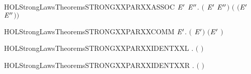 \newcommand{\HOLStrongLawsTheoremsSTRONGXXLEFTXXSUMXXMIDXXIDEMP}{\UseVerbatim{HOLStrongLawsTheoremsSTRONGXXLEFTXXSUMXXMIDXXIDEMP}}
\begin{SaveVerbatim}{HOLStrongLawsTheoremsSTRONGXXPARXXASSOC}
\HOLTokenTurnstile{} \HOLSymConst{\HOLTokenForall{}} \ensuremath{\HOLBoundVar{E}\sp{\prime}} \ensuremath{\HOLBoundVar{E}\sp{\prime\prime}}.  \ensuremath{(} \HOLSymConst{\ensuremath{\mid}} \ensuremath{\HOLBoundVar{E}\sp{\prime}} \HOLSymConst{\ensuremath{\mid}} \ensuremath{\HOLBoundVar{E}\sp{\prime\prime}}\ensuremath{)} \ensuremath{(} \HOLSymConst{\ensuremath{\mid}} \ensuremath{(}\ensuremath{\HOLBoundVar{E}\sp{\prime}} \HOLSymConst{\ensuremath{\mid}} \ensuremath{\HOLBoundVar{E}\sp{\prime\prime}}\ensuremath{)}\ensuremath{)}
\end{SaveVerbatim}
\newcommand{\HOLStrongLawsTheoremsSTRONGXXPARXXASSOC}{\UseVerbatim{HOLStrongLawsTheoremsSTRONGXXPARXXASSOC}}
\begin{SaveVerbatim}{HOLStrongLawsTheoremsSTRONGXXPARXXCOMM}
\HOLTokenTurnstile{} \HOLSymConst{\HOLTokenForall{}} \ensuremath{\HOLBoundVar{E}\sp{\prime}}.  \ensuremath{(} \HOLSymConst{\ensuremath{\mid}} \ensuremath{\HOLBoundVar{E}\sp{\prime}}\ensuremath{)} \ensuremath{(}\ensuremath{\HOLBoundVar{E}\sp{\prime}} \HOLSymConst{\ensuremath{\mid}} \ensuremath{)}
\end{SaveVerbatim}
\newcommand{\HOLStrongLawsTheoremsSTRONGXXPARXXCOMM}{\UseVerbatim{HOLStrongLawsTheoremsSTRONGXXPARXXCOMM}}
\begin{SaveVerbatim}{HOLStrongLawsTheoremsSTRONGXXPARXXIDENTXXL}
\HOLTokenTurnstile{} \HOLSymConst{\HOLTokenForall{}}.  \ensuremath{(} \HOLSymConst{\ensuremath{\mid}} \ensuremath{)} 
\end{SaveVerbatim}
\newcommand{\HOLStrongLawsTheoremsSTRONGXXPARXXIDENTXXL}{\UseVerbatim{HOLStrongLawsTheoremsSTRONGXXPARXXIDENTXXL}}
\begin{SaveVerbatim}{HOLStrongLawsTheoremsSTRONGXXPARXXIDENTXXR}
\HOLTokenTurnstile{} \HOLSymConst{\HOLTokenForall{}}.  \ensuremath{(} \HOLSymConst{\ensuremath{\mid}} \ensuremath{)} 
\end{SaveVerbatim}
\newcommand{\HOLStrongLawsTheoremsSTRONGXXPARXXIDENTXXR}{\UseVerbatim{HOLStrongLawsTheoremsSTRONGXXPARXXIDENTXXR}}
